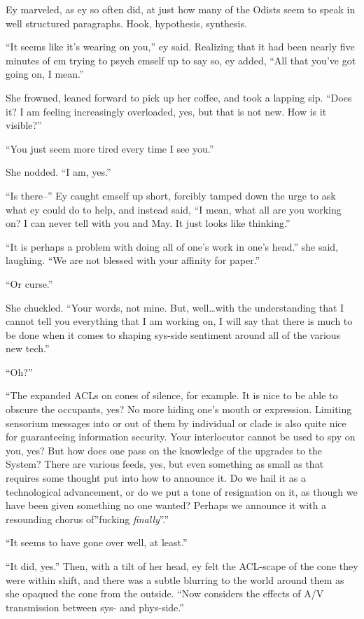 Ey marveled, as ey so often did, at just how many of the Odists seem to speak in well structured paragraphs. Hook, hypothesis, synthesis.

``It seems like it's wearing on you,'' ey said. Realizing that it had been nearly five minutes of em trying to psych emself up to say so, ey added, ``All that you've got going on, I mean.''

She frowned, leaned forward to pick up her coffee, and took a lapping sip. ``Does it? I am feeling increasingly overloaded, yes, but that is not new. How is it visible?''

``You just seem more tired every time I see you.''

She nodded. ``I am, yes.''

``Is there--'' Ey caught emself up short, forcibly tamped down the urge to ask what ey could do to help, and instead said, ``I mean, what all are you working on? I can never tell with you and May. It just looks like thinking.''

``It is perhaps a problem with doing all of one's work in one's head.'' she said, laughing. ``We are not blessed with your affinity for paper.''

``Or curse.''

She chuckled. ``Your words, not mine. But, well\ldots with the understanding that I cannot tell you everything that I am working on, I will say that there is much to be done when it comes to shaping sys-side sentiment around all of the various new tech.''

``Oh?''

``The expanded ACLs on cones of silence, for example. It is nice to be able to obscure the occupants, yes? No more hiding one's mouth or expression. Limiting sensorium messages into or out of them by individual or clade is also quite nice for guaranteeing information security. Your interlocutor cannot be used to spy on you, yes? But how does one pass on the knowledge of the upgrades to the System? There are various feeds, yes, but even something as small as that requires some thought put into how to announce it. Do we hail it as a technological advancement, or do we put a tone of resignation on it, as though we have been given something no one wanted? Perhaps we announce it with a resounding chorus of''fucking \emph{finally}''.''

``It seems to have gone over well, at least.''

``It did, yes.'' Then, with a tilt of her head, ey felt the ACL-scape of the cone they were within shift, and there was a subtle blurring to the world around them as she opaqued the cone from the outside. ``Now considers the effects of A/V transmission between sys- and phys-side.''

